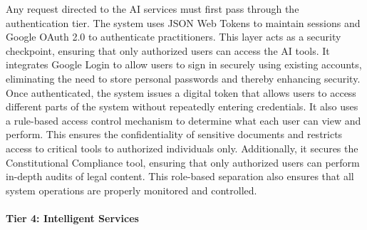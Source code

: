Any request directed to the AI services must first pass through the authentication tier. The system uses JSON Web Tokens to maintain sessions and Google OAuth 2.0 to authenticate practitioners. This layer acts as a security checkpoint, ensuring that only authorized users can access the AI tools. It integrates Google Login to allow users to sign in securely using existing accounts, eliminating the need to store personal passwords and thereby enhancing security. Once authenticated, the system issues a digital token that allows users to access different parts of the system without repeatedly entering credentials. It also uses a rule-based access control mechanism to determine what each user can view and perform. This ensures the confidentiality of sensitive documents and restricts access to critical tools to authorized individuals only. Additionally, it secures the Constitutional Compliance tool, ensuring that only authorized users can perform in-depth audits of legal content. This role-based separation also ensures that all system operations are properly monitored and controlled.

\paragraph{\textbf{Tier 4: Intelligent Services}}

